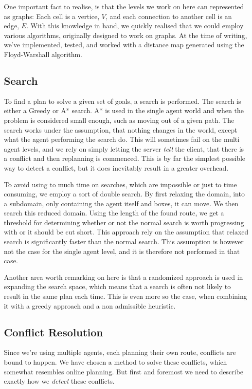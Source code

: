 \documentclass[letterpaper]{article}
\begin{document}
		One important fact to realise, is that the levels we work on here can represented as graphs: Each cell is a vertice, $V$, and each connection to another cell is an edge, $E$. With this knowledge in hand, we quickly realised that we could employ various algorithms, originally designed to work on graphs. At the time of writing, we've implemented, tested, and worked with a distance map generated using the Floyd-Warshall algorithm.

	\subsection{Search}
		\label{sec:search}
		To find a plan to solve a given set of goals, a search is performed. The search is either a Greedy or A* search. A* is used in the single agent world and when the problem is considered small enough, such as moving out of a given path. 
		The search works under the assumption, that nothing changes in the world, except what the agent performing the search do. This will sometimes fail on the multi agent levels, and we rely on simply letting the server \emph{tell} the client, that there is a conflict and then replanning is commenced. This is by far the simplest possible way to detect a conflict, but it does inevitably result in a greater overhead. 
		
		
		To avoid using to much time on searches, which are impossible or just to time consuming, we employ a sort of double search. By first relaxing the domain, into a subdomain, only containing the agent itself and boxes, it can move. We then search this reduced domain. Using the length of the found route, we get a threshold for determining whether or not the normal search is worth progressing with or it should be cut short. This approach rely on the assumption that relaxed search is significantly faster than the normal search. This assumption is however not the case for the single agent level, and it is therefore not performed in that case.
		
		
		
		
		Another area worth remarking on here is that a randomized approach is used in expanding the search space, which means that a search is often not likely to result in the same plan each time. This is even more so the case, when combining it with a greedy approach and a non admissible heuristic.




	\subsection{Conflict Resolution}
		Since we're using multiple agents, each planning their own route, conflicts are bound to happen. We have chosen a method to solve these conflicts, which somewhat resembles online planning. But first and foremost we need to describe exactly how we \emph{detect} these conflicts.
\end{document}
